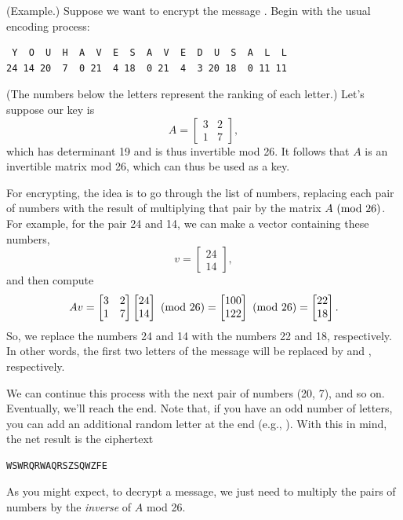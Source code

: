 \documentclass[letterpaper]{article}
\newcommand{\0}{\mathbf{0}}
\begin{document}
\begin{mdframed}
    (Example.) Suppose we want to encrypt the message \textbf{}. Begin with the usual encoding process: 
    \begin{mdframed}
        \begin{verbatim}
 Y  O  U  H  A  V  E  S  A  V  E  D  U  S  A  L  L
24 14 20  7  0 21  4 18  0 21  4  3 20 18  0 11 11\end{verbatim}
    \end{mdframed} 
    (The numbers below the letters represent the ranking of each letter.) Let's suppose our key is \[A = \begin{bmatrix}
        3 & 2 \\ 1 & 7
    \end{bmatrix},\] which has determinant 19 and is thus invertible mod 26. It follows that $A$ is an invertible matrix mod 26, which can thus be used as a key. 

    \bigskip 

    For encrypting, the idea is to go through the list of numbers, replacing each pair of numbers with the result of multiplying that pair by the matrix $A \ (\mathrm{mod}\ 26)$. For example, for the pair 24 and 14, we can make a vector containing these numbers, \[v = \begin{bmatrix}
        24 \\ 14
    \end{bmatrix},\] and then compute \[Av = \begin{bmatrix}
        3 & 2 \\ 1 & 7
    \end{bmatrix} \begin{bmatrix}
        24 \\ 14
    \end{bmatrix} \ (\mathrm{mod}\ 26) = \begin{bmatrix}
        100 \\ 122
    \end{bmatrix} \ (\mathrm{mod}\ 26) = \begin{bmatrix}
        22 \\ 18
    \end{bmatrix}.\]
    So, we replace the numbers 24 and 14 with the numbers 22 and 18, respectively. In other words, the first two letters of the message will be replaced by  and , respectively. 

    \bigskip 

    We can continue this process with the next pair of numbers (20, 7), and so on. Eventually, we'll reach the end. Note that, if you have an odd number of letters, you can add an additional random letter at the end (e.g., ). With this in mind, the net result is the ciphertext
    \begin{mdframed}
\begin{verbatim}
WSWRQRWAQRSZSQWZFE\end{verbatim}
    \end{mdframed}

    As you might expect, to decrypt a message, we just need to multiply the pairs of numbers by the \emph{inverse} of $A$ mod 26.
\end{mdframed}
\end{document}
